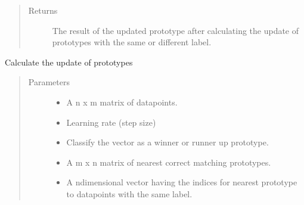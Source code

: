 \documentclass[letterpaper,10pt,english]{sphinxmanual}
\begin{document}
\begin{fulllineitems}
\begin{fulllineitems}
\begin{quote}
\begin{description}
\begin{itemize}
\end{itemize}

\item[{Returns}] \leavevmode
\sphinxAtStartPar
The result of the updated prototype after calculating the update of prototypes with the same or different label.

\end{description}\end{quote}

\end{fulllineitems}


\begin{fulllineitems}
\label{\detokenize{Renyi_final:Renyi_final.GLVQ.change_in_w_plus}}
\sphinxAtStartPar
Calculate the update of prototypes
\begin{quote}\begin{description}
\item[{Parameters}] \leavevmode\begin{itemize}
\item {} 
\sphinxAtStartPar
{} \textendash{} A n x m matrix of datapoints.

\item {} 
\sphinxAtStartPar
{} \textendash{} Learning rate (step size)

\item {} 
\sphinxAtStartPar
{} \textendash{} Classify the vector as a winner or runner up prototype.

\item {} 
\sphinxAtStartPar
{} \textendash{} A m x n matrix of nearest correct matching prototypes.

\item {} 
\sphinxAtStartPar
{} \textendash{} A n\sphinxhyphen{}dimensional vector having the indices for nearest prototype to datapoints with the same label.


\end{itemize}
\end{description}
\end{quote}
\end{fulllineitems}
\end{fulllineitems}
\end{document}
